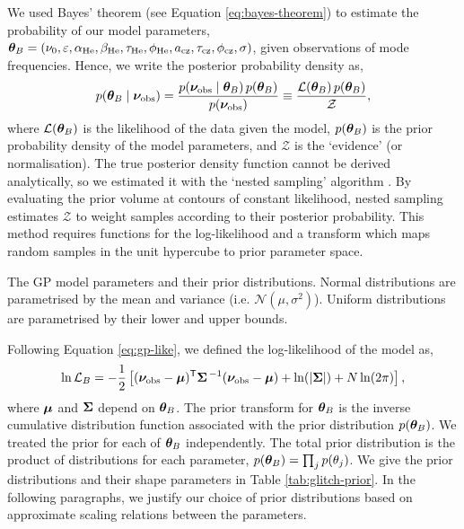 We used Bayes' theorem (see Equation \ref{eq:bayes-theorem}) to estimate the probability of our model parameters, \(\bm{\theta}_B = (\nu_0, \varepsilon, \alpha_{{\mathrm{He}}}, \beta_{{\mathrm{He}}}, \tau_{{\mathrm{He}}}, \phi_{{\mathrm{He}}}, a_{{\mathrm{cz}}}, \tau_{{\mathrm{cz}}}, \phi_{{\mathrm{cz}}}, \sigma)\), given observations of mode frequencies. Hence, we write the posterior probability density as,
%
\begin{equation}
    p(\bm{\theta}_B \mid \bm{\nu}_{{\mathrm{obs}}}) = \frac{p(\bm{\nu}_{{\mathrm{obs}}} \mid \bm{\theta}_B)\,p(\bm{\theta}_B)}{p(\bm{\nu}_{{\mathrm{obs}}})} \equiv \frac{\mathcal{L}(\bm{\theta}_B)\,p(\bm{\theta}_B)}{\mathcal{Z}},
\end{equation}
%
where \(\mathcal{L}(\bm{\theta}_B)\) is the likelihood of the data given the model, \(p(\bm{\theta}_B)\) is the prior probability density of the model parameters, and \(\mathcal{Z}\) is the `evidence' (or normalisation). The true posterior density function cannot be derived analytically, so we estimated it with the `nested sampling' algorithm \citep{Skilling2004}. By evaluating the prior volume at contours of constant likelihood, nested sampling estimates \(\mathcal{Z}\) to weight samples according to their posterior probability. This method requires functions for the log-likelihood and a transform which maps random samples in the unit hypercube to prior parameter space. 

\begin{table}
    \centering
    \caption[The GP model parameters and their prior distributions.]{The GP model parameters and their prior distributions. Normal distributions are parametrised by the mean and variance (i.e. \(\mathcal{N}(\mu,\sigma^2)\)). Uniform distributions are parametrised by their lower and upper bounds.}
    \label{tab:glitch-prior}
    
\end{table}

Following Equation \ref{eq:gp-like}, we defined the log-likelihood of the model as,
%
\begin{equation}
    \ln\mathcal{L}_B = - \frac12 \left[ {(\bm{\nu}_{{\mathrm{obs}}} - \bm{\mu})^\mathsf{T} \bm{\Sigma}^{\,-1} (\bm{\nu}_{{\mathrm{obs}}} - \bm{\mu})} + \ln(| \bm{\Sigma} |) + N\ln(2 \pi) \right],
\end{equation}
%
where \(\bm{\mu}\) and \(\bm{\Sigma}\) depend on \(\bm{\theta}_B\). The prior transform for \(\bm{\theta}_B\) is the inverse cumulative distribution function associated with the prior distribution \(p(\bm{\theta}_B)\). We treated the prior for each of \(\bm{\theta}_B\) independently. The total prior distribution is the product of distributions for each parameter, \(p(\bm{\theta}_B) = \prod_j p(\theta_{j})\). We give the prior distributions and their shape parameters in Table \ref{tab:glitch-prior}. In the following paragraphs, we justify our choice of prior distributions based on approximate scaling relations between the parameters. %


